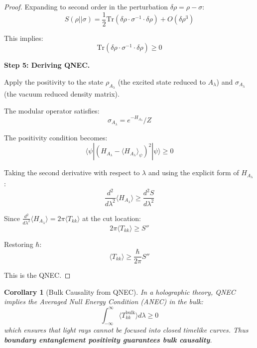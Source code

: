 \documentclass[12pt,a4paper]{article}
\newtheorem{corollary}[theorem]{Corollary}
\begin{document}
\begin{proof}
Expanding to second order in the perturbation $\delta\rho = \rho - \sigma$:
\begin{equation}
S(\rho||\sigma) = \frac{1}{2}\text{Tr}(\delta\rho \cdot \sigma^{-1} \cdot \delta\rho) + O(\delta\rho^3)
\end{equation}

This implies:
\begin{equation}
\text{Tr}(\delta\rho \cdot \sigma^{-1} \cdot \delta\rho) \geq 0
\end{equation}

\textbf{Step 5: Deriving QNEC.}

Apply the positivity to the state $\rho_{A_\lambda}$ (the excited state reduced to $A_\lambda$) and $\sigma_{A_\lambda}$ (the vacuum reduced density matrix).

The modular operator satisfies:
\begin{equation}
\sigma_{A_\lambda} = e^{-H_{A_\lambda}}/Z
\end{equation}

The positivity condition becomes:
\begin{equation}
\langle \psi| (H_{A_\lambda} - \langle H_{A_\lambda}\rangle_\psi)^2 |\psi\rangle \geq 0
\end{equation}

Taking the second derivative with respect to $\lambda$ and using the explicit form of $H_{A_\lambda}$:
\begin{equation}
\frac{d^2}{d\lambda^2}\langle H_{A_\lambda}\rangle \geq \frac{d^2 S}{d\lambda^2}
\end{equation}

Since $\frac{d^2}{d\lambda^2}\langle H_{A_\lambda}\rangle = 2\pi \langle T_{kk}\rangle$ at the cut location:
\begin{equation}
2\pi \langle T_{kk} \rangle \geq S''
\end{equation}

Restoring $\hbar$:
\begin{equation}
\langle T_{kk} \rangle \geq \frac{\hbar}{2\pi} S''
\end{equation}

This is the QNEC.
\end{proof}

\begin{corollary}[Bulk Causality from QNEC]
In a holographic theory, QNEC implies the Averaged Null Energy Condition (ANEC) in the bulk:
\begin{equation}
\int_{-\infty}^{\infty} \langle T_{kk}^{\text{bulk}} \rangle d\lambda \geq 0
\end{equation}
which ensures that light rays cannot be focused into closed timelike curves. Thus \textbf{boundary entanglement positivity guarantees bulk causality}.
\end{corollary}
\end{document}
